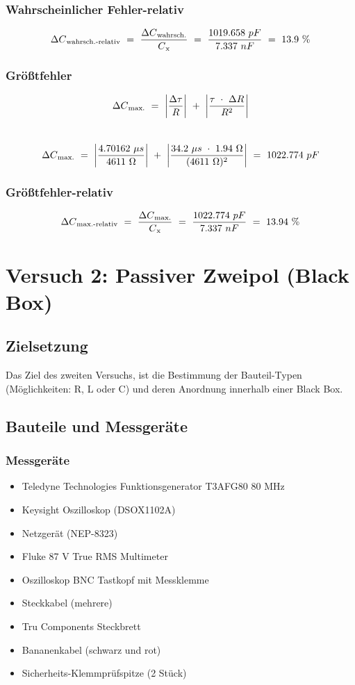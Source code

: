 \documentclass[a4paper,12pt]{article}
\begin{document}
\subsubsection* {Wahrscheinlicher Fehler-relativ}
\[
\Delta C\textsubscript{wahrsch.-relativ}~=~\frac{\Delta C\textsubscript{wahrsch.}}{C\textsubscript{x}}~=~\frac{1019.658~pF}{7.337~nF}~=~13.9~\%
\]


\subsubsection* {Größtfehler}
\[
\Delta C\textsubscript{max.}~=~\left\lvert \frac{\Delta \tau}{R}\right\rvert~+~\left\lvert \frac{\tau~\cdot~\Delta R}{R^2}\right\rvert
\]\\
\[
\Delta C\textsubscript{max.}~=~\left\lvert \frac{4.70162~\mu s}{4611~\Omega}\right\rvert~+~\left\lvert \frac{34.2~\mu s~\cdot~1.94~\Omega}{(4611~\Omega)^2}\right\rvert~=~1022.774~pF
\]
\subsubsection* {Größtfehler-relativ}
\[
\Delta C\textsubscript{max.-relativ}~=~\frac{\Delta C\textsubscript{max.}}{C\textsubscript{x}}~=~\frac{1022.774~pF}{7.337~nF}~=~13.94~\%
\]



\newpage
\section{Versuch 2: Passiver Zweipol (Black Box)}
\subsection{Zielsetzung}
Das Ziel des zweiten Versuchs, ist die Bestimmung der Bauteil-Typen (Möglichkeiten: R, L oder C) und deren Anordnung innerhalb einer
Black Box.

\subsection{Bauteile und Messgeräte}
\subsubsection*{Messgeräte}
\begin{itemize}
\item Teledyne Technologies Funktionsgenerator T3AFG80 80 MHz
\item Keysight Oszilloskop (DSOX1102A)
\item Netzgerät (NEP-8323)
\item Fluke 87 V True RMS Multimeter
\item Oszilloskop BNC Tastkopf mit Messklemme
\item Steckkabel (mehrere)
\item Tru Components Steckbrett
\item Bananenkabel (schwarz und rot)
\item Sicherheits-Klemmprüfspitze (2 Stück)
\end{itemize}
\end{document}
